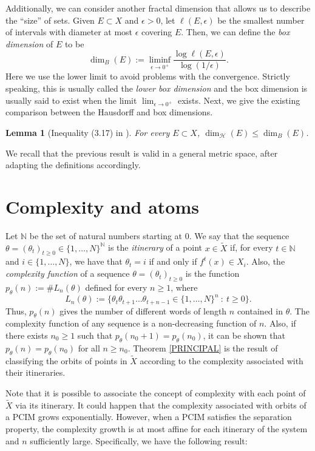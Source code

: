 \documentclass[a4paper]{article}
\newtheorem{lemma}[theorem]{Lemma}
\begin{document}
Additionally, we can consider another fractal dimension that allows us to describe the ``size'' of sets. Given $E\subset X$ and $\epsilon>0$, let $\ell(E,\epsilon)$ be the smallest number of intervals with diameter at most $\epsilon$ covering $E$. Then, we can define the {\em box dimension} of $E$ to be 
\[
    \dim_B(E):=\liminf_{\epsilon\to0^+}\frac{\log \ell(E,\epsilon)}{\log(1/\epsilon)}.
\]
Here we use the lower limit to avoid problems with the convergence. Strictly speaking, this is usually called the {\em lower box dimension} and the box dimension is usually said to exist when the limit $\lim_{\epsilon \to 0^+}$ exists. Next, we {give} the existing comparison between the Hausdorff and box dimensions.

\begin{lemma}[Inequality (3.17) in \cite{F04}]\label{COMPARISON}
    For every $E\subset X$, $\dim_{\mathcal H}(E)\leq\dim_B(E)$.
\end{lemma}
{We recall that the previous result is valid in a general metric space, after adapting the definitions accordingly.}

\section{Complexity and atoms}

Let $\mathbb N$ be the set of natural numbers starting at 0. We say that the sequence $\theta=(\theta_t)_{t\geq0}\in\{1,\ldots,N\}^{\mathbb N}$ is the {\em itinerary} of a point $x\in\widetilde X$ if, for every $t\in\mathbb N$ and $i\in\{1,\ldots,N\}$, we have that $\theta_t=i$ if and only if $f^t(x)\in X_i$. Also, the {\em complexity function} of a sequence $\theta=(\theta_t)_{t\geq0}$ is the function $p_\theta(n):=\#L_n(\theta)$ defined for every $n\geq1$, where
\[
    L_n(\theta):=\big\{\theta_t\theta_{t+1}\ldots\theta_{t+n-1}\in\{1,\ldots,N\}^n\ :\ t\geq0\big\}.
\]
Thus, $p_\theta(n)$ gives the number of different words of length $n$ contained in $\theta$. The complexity function of any sequence is a non-decreasing function of $n$. Also, if there exists $n_0\geq1$ such that $p_\theta(n_0+1)=p_\theta(n_0)$, it can be shown that $p_\theta(n)=p_\theta(n_0)$ for all $n\geq n_0$. Theorem \ref{PRINCIPAL} is the result of classifying the orbits of points in $\widetilde X$ according to the complexity associated with their itineraries. %

Note that it is possible to associate the concept of complexity with each point of $\widetilde X$ via its itinerary. It could happen that the complexity associated with orbits of a PCIM grows exponentially. However, when a PCIM satisfies the separation property, the complexity growth is at most affine for each itinerary of the system and $n$ sufficiently large. Specifically, we have the following result:
\end{document}
